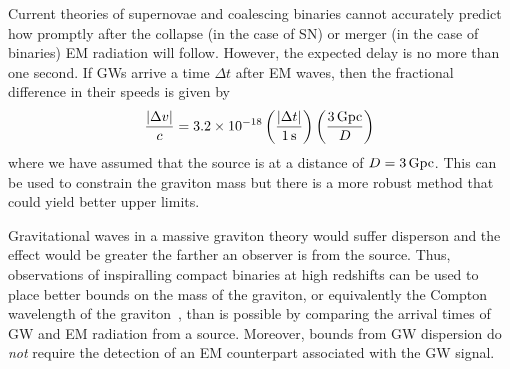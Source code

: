 Current theories of supernovae and coalescing binaries
cannot accurately predict how promptly after the collapse
(in the case of SN) or merger (in the case of binaries)
EM radiation will follow. However, the expected delay is
no more than one second.
If GWs arrive a time $\Delta t$ after EM
waves, then the fractional difference in their speeds is
given by
\begin{equation}
\frac{|\Delta v|}{c} = 3.2 \times 10^{-18}
\left ( \frac{|\Delta t|}{1\,\rm s} \right )
\left ( \frac{3\, \rm Gpc} {D} \right )
\end{equation}
where we have assumed that the source is at a distance of
$D=3\,\rm Gpc$. This can be used to constrain the graviton
mass but there is a more robust method that could yield
better upper limits.

Gravitational waves in a massive graviton theory would suffer disperson and
the effect would be greater the farther an observer is from the source.
Thus, observations of inspiralling compact binaries at high redshifts
can be used to place better bounds on the mass of the graviton, or equivalently
the Compton wavelength of the graviton~\cite{bss:will.98}, than is possible
by comparing the arrival times of GW and EM radiation from a source. Moreover, 
bounds from GW dispersion do \emph{not} require the detection of an EM counterpart 
associated with the GW signal.
%
